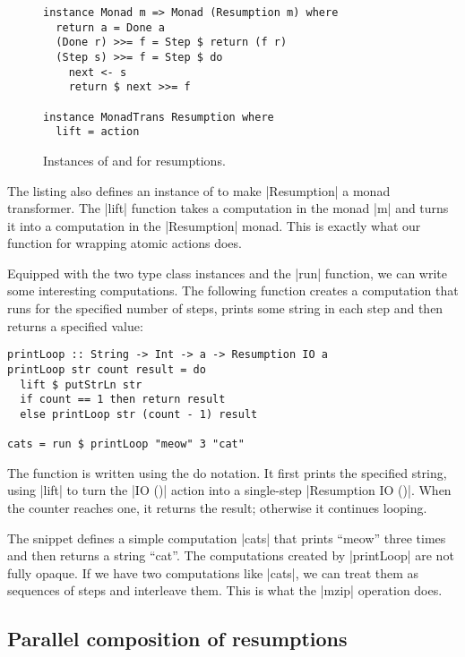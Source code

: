 \documentclass{tmr}
\begin{document}
\begin{figure}
\begin{verbatim}
instance Monad m => Monad (Resumption m) where
  return a = Done a
  (Done r) >>= f = Step $ return (f r)
  (Step s) >>= f = Step $ do
    next <- s
    return $ next >>= f

instance MonadTrans Resumption where
  lift = action
\end{verbatim}
\caption{Instances of  and  
  for resumptions.}
\label{fig:poorman-instance}
\end{figure}

The listing also defines an instance of  to make |Resumption| a monad transformer.
The |lift| function takes a computation in the monad |m| and turns it into a computation in the 
|Resumption| monad. This is exactly what our function for wrapping atomic actions does.

Equipped with the two type class instances and the |run| function, we can write some interesting
computations. The following function creates a computation that runs for the specified number of
steps, prints some string in each step and then returns a specified value:

\begin{verbatim}
printLoop :: String -> Int -> a -> Resumption IO a
printLoop str count result = do
  lift $ putStrLn str
  if count == 1 then return result
  else printLoop str (count - 1) result

cats = run $ printLoop "meow" 3 "cat"
\end{verbatim}
The function is written using the do notation. It first prints the specified string, using 
|lift| to turn the |IO ()| action into a single-step |Resumption IO ()|. When the counter reaches
one, it returns the result; otherwise it continues looping.

The snippet defines a simple computation |cats| that prints ``meow'' three times and then 
returns a string ``cat''. The computations created by |printLoop| are not fully opaque. If we have 
two computations like |cats|, we can treat them as sequences of steps and interleave them. 
This is what the |mzip| operation does.


\subsection{Parallel composition of resumptions}
\end{document}
